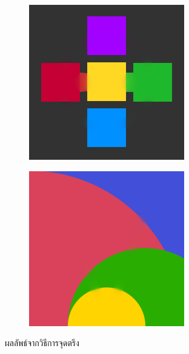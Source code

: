 \documentclass[hidelinks, a4paper,12pt]{article}
\numberwithin{equation}{section}							%
\numberwithin{equation}{section}
\begin{document}
{\begin{figure}[H]
\begin{subfigure}{0.4\linewidth}
		\includegraphics[width=0.8\linewidth]{images/result_ex1/fixpoint04.png}			
	\end{subfigure}
	\begin{subfigure}{0.4\linewidth}
		\centering
		\includegraphics[width=0.8\linewidth]{images/result_ex1/fixpoint05.png}			
	\end{subfigure}
	\caption{ผลลัพธ์จากวิธีการจุดตรึง}
\end{figure}
\begin{figure}[H]
	\centering
	\begin{subfigure}{0.4\linewidth}
		\centering

\end{subfigure}
\end{figure}}
\end{document}
